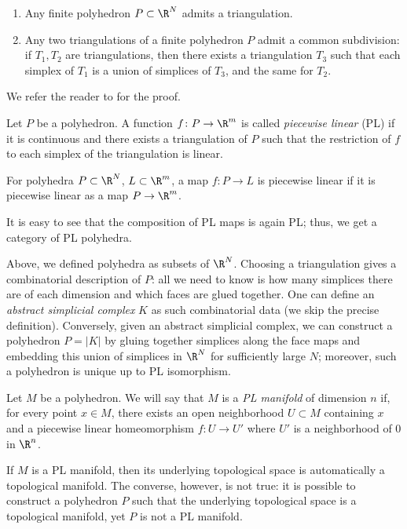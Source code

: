 \begin{theorem}\label{t:triangulation1}
  \par\noindent
  \begin{enumerate}
  \item
    Any finite polyhedron $P\subset \R^N$ admits a triangulation.
  \item
    Any two triangulations of a finite polyhedron $P$ admit a common
    subdivision: if $T_1,T_2$ are triangulations, then there exists a
    triangulation $T_3$ such that each simplex of $T_1$ is a union of simplices
    of $T_3$, and the same for $T_2$.
   \end{enumerate}
\end{theorem}
We refer the reader to \cite[Theorem 2.11, Addendum 2.12]{rourke} for
the proof.
\begin{definition}
  Let $P$ be a polyhedron. A function $f\colon P\to \R^m$ is called \emph{%
  piecewise linear} (PL) if it is continuous and there exists a triangulation of
  $P$ such that the restriction of $f$ to each simplex of the triangulation
  is linear.

  For polyhedra $P\subset \R^N$, $L\subset \R^m$, a map $f\colon P\to L$
  is piecewise linear if it is piecewise linear as a map $P\to \R^m$.
\end{definition}
It is easy to see that the composition of PL maps is again PL; thus, we get a
category of PL polyhedra.

\begin{remark}
  Above, we defined polyhedra as subsets of $\R^N$. Choosing a triangulation
  gives a combinatorial description of $P$: all we need to know is how many
  simplices there are of each dimension and which faces are glued together. One
  can define an \emph{abstract simplicial complex} $K$ as such combinatorial
  data (we skip the precise definition). Conversely, given an abstract
  simplicial complex, we can construct a polyhedron $P=|K|$ by gluing together
  simplices along the face maps and embedding this union of simplices in $\R^N$
  for sufficiently large $N$; moreover, such a polyhedron is unique up to PL
  isomorphism.
\end{remark}

\begin{definition}\label{d:PLmanifold}
  Let $M$ be a polyhedron. We will say that $M$ is a \emph{PL manifold} of dimension $n$ if, for every point $x \in M$, there exists an open
  neighborhood $U \subset M$ containing $x$ and a piecewise linear homeomorphism
  $f\colon U \to U'$ where $U'$ is a neighborhood of 0 in $\R^n$.
\end{definition}
\begin{remark}
  If $M$ is a PL manifold, then its underlying topological space is
  automatically a topological manifold. The converse, however, is not true: it
  is possible to construct a polyhedron $P$ such that the underlying topological
  space is a topological manifold, yet $P$ is not a PL manifold.
\end{remark}

